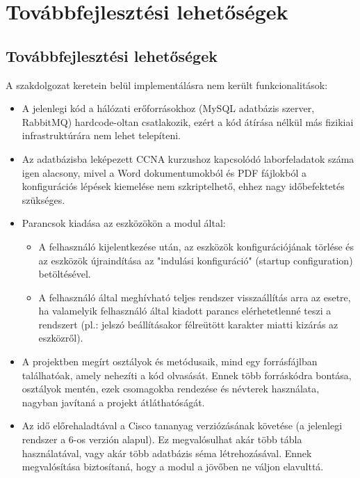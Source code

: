 \documentclass[12pt]{report}
\begin{document}
\chapter{Továbbfejlesztési lehetőségek}
\section{Továbbfejlesztési lehetőségek}

A szakdolgozat keretein belül implementálásra nem került funkcionalitások:
\begin{itemize}
    \item A jelenlegi kód a hálózati erőforrásokhoz (MySQL adatbázis szerver, RabbitMQ) hardcode-oltan csatlakozik, ezért a kód átírása nélkül más fizikiai infrastruktúrára nem lehet telepíteni.
    \item Az adatbázisba leképezett CCNA kurzushoz kapcsolódó laborfeladatok száma igen alacsony, mivel a Word dokumentumokból és PDF fájlokból a konfigurációs lépések kiemelése nem szkriptelhető, ehhez nagy időbefektetés szükséges.
    \item Parancsok kiadása az eszközökön a modul által:
    \begin{itemize}
        \item A felhasználó kijelentkezése után, az eszközök konfigurációjának törlése és az eszközök újraindítása az "indulási konfiguráció" (startup configuration) betöltésével.
        \item A felhasználó által meghívható teljes rendszer visszaállítás arra az esetre, ha valamelyik felhasználó által kiadott parancs elérhetetlenné teszi a rendszert (pl.: jelszó beállításakor félreütött karakter miatti kizárás az eszközről).
    \end{itemize}
    \item A projektben megírt osztályok és metódusaik, mind egy forrásfájlban találhatóak, amely nehezíti a kód olvasását. Ennek több forráskódra bontása, osztályok mentén, ezek csomagokba rendezése és névterek használata, nagyban javítaná a projekt átláthatóságát.
    \newpage
    \item Az idő előrehaladtával a Cisco tananyag verziózásának követése (a jelenlegi rendszer a 6-os verzión alapul). Ez megvalósulhat akár több tábla használatával, vagy akár több adatbázis séma létrehozásával. Ennek megvalósítása biztosítaná, hogy a modul a jövőben ne váljon elavulttá.
\end{itemize}
\end{document}
